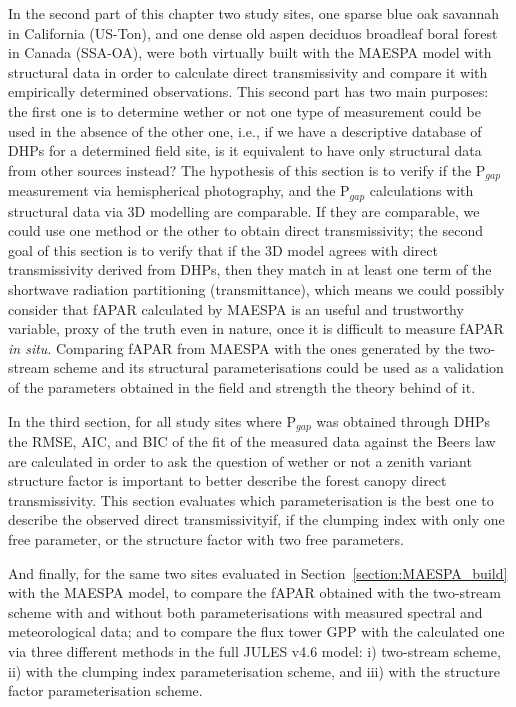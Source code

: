 In the second part of this chapter two study sites, one sparse blue oak savannah in California (US-Ton), and one dense old aspen deciduos broadleaf boral forest in Canada (SSA-OA), were both virtually built with the MAESPA model with structural data in order to calculate direct transmissivity and compare it with empirically determined observations. This second part has two main purposes: the first one is to determine wether or not one type of measurement could be used in the absence of the other one, i.e., if we have a descriptive database of DHPs for a determined field site, is it equivalent to have only structural data from other sources instead? The hypothesis of this section is to verify if the P$_{gap}$ measurement via hemispherical photography, and the P$_{gap}$ calculations with structural data via 3D modelling are comparable. If they are comparable, we could use one method or the other to obtain direct transmissivity; the second goal of this section is to verify that if the 3D model agrees with direct transmissivity derived from DHPs, then they match in at least one term of the shortwave radiation partitioning (transmittance), which means we could possibly consider that fAPAR calculated by MAESPA is an useful and trustworthy variable, proxy of the truth even in nature, once it is difficult to measure fAPAR \textit{in situ}. Comparing fAPAR from MAESPA with the ones generated by the two-stream scheme and its structural parameterisations could be used as a validation of the parameters obtained in the field and strength the theory behind of it.

In the third section, for all study sites where P$_{gap}$ was obtained through DHPs the RMSE, AIC, and BIC of the fit of the measured data against the Beer\textquotesingle s law are calculated in order to ask the question of wether or not a zenith variant structure factor is important to better describe the forest canopy direct transmissivity. This section evaluates which parameterisation is the best one to describe the observed direct transmissivityif, if the clumping index with only one free parameter, or the structure factor with two free parameters.

And finally, for the same two sites evaluated in Section~\ref{section:MAESPA_build} with the MAESPA model, to compare the fAPAR obtained with the two-stream scheme with and without both parameterisations with measured spectral and meteorological data; and to compare the flux tower GPP with the calculated one via three different methods in the full JULES v4.6 model: i) two-stream scheme, ii) with the clumping index parameterisation scheme, and iii) with the structure factor parameterisation scheme.

